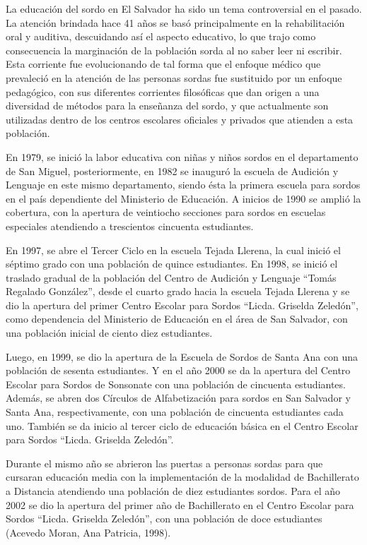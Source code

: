 \documentclass[12pt]{report}%
\begin{document}
La educación del sordo en El Salvador ha sido un tema controversial en el pasado. La atención brindada hace 41 años se basó principalmente en la rehabilitación oral y auditiva, descuidando así el aspecto educativo, lo que trajo como consecuencia la marginación de la población sorda al no saber leer ni escribir. Esta corriente fue evolucionando de tal forma que el enfoque médico que prevaleció en la atención de las personas sordas fue sustituido por un enfoque pedagógico, con sus diferentes corrientes filosóficas que dan origen a una diversidad de métodos para la enseñanza del sordo, y que actualmente son utilizadas dentro de los centros escolares oficiales y privados que atienden a esta población.

En 1979, se inició la labor educativa con niñas y niños sordos en el departamento de San Miguel, posteriormente, en 1982 se inauguró la escuela de Audición y Lenguaje en este mismo departamento, siendo ésta la primera escuela para sordos en el país dependiente del Ministerio de Educación. A inicios de 1990 se amplió la cobertura, con la apertura de veintiocho secciones para sordos en escuelas especiales atendiendo a trescientos cincuenta estudiantes.

En 1997, se abre el Tercer Ciclo en la escuela Tejada Llerena, la cual inició el séptimo grado con una población de quince estudiantes. En 1998, se inició el traslado gradual de la población del Centro de Audición y Lenguaje “Tomás Regalado González”, desde el cuarto grado hacia la escuela Tejada Llerena y se dio la apertura del primer Centro Escolar para Sordos “Licda. Griselda Zeledón”, como dependencia del Ministerio de Educación en el área de San Salvador, con una población inicial de ciento diez estudiantes.

Luego, en 1999, se dio la apertura de la Escuela de Sordos de Santa Ana con una población de sesenta estudiantes. Y en el año 2000 se da la apertura del Centro Escolar para Sordos de Sonsonate con una población de cincuenta estudiantes. Además, se abren dos Círculos de Alfabetización para sordos en San Salvador y Santa Ana, respectivamente, con una población de cincuenta estudiantes cada uno. También se da inicio al tercer ciclo de educación básica en el Centro Escolar para Sordos “Licda. Griselda Zeledón”.

Durante el mismo año se abrieron las puertas a personas sordas para que cursaran educación media con la implementación de la modalidad de Bachillerato a Distancia atendiendo una población de diez estudiantes sordos. Para el año 2002 se dio la apertura del primer año de Bachillerato en el Centro Escolar para Sordos “Licda. Griselda Zeledón”, con una población de doce estudiantes (Acevedo Moran, Ana Patricia, 1998).
\end{document}
